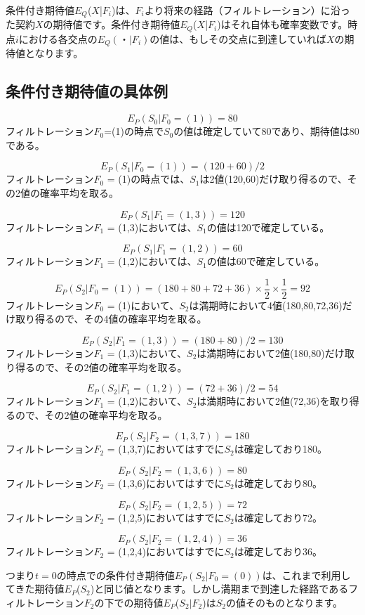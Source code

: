 \documentclass[uplatex,a4j,12pt,dvipdfmx]{jsarticle}
\begin{document}
条件付き期待値$E_Q$($X$|$F_i$)は、$F_i$より将来の経路（フィルトレーション）に沿った契約$X$の期待値です。条件付き期待値$E_Q$($X$|$F_i$)はそれ自体も確率変数です。時点$i$における各交点の$E_Q(・|F_i)$の値は、もしその交点に到達していれば$X$の期待値となります。

\subsection{条件付き期待値の具体例}

\[E_P( S_0 | F_0=(1) ) = 80\]
フィルトレーション$F_0$=(1)の時点で$S_0$の値は確定していて80であり、期待値は80である。

\[E_P( S_1 | F_0=(1) ) = (120+60)/2\]
フィルトレーション$F_0$ = (1)の時点では、$S_1$は2値(120,60)だけ取り得るので、その2値の確率平均を取る。

\[E_P( S_1 | F_1=(1,3) ) = 120\]
フィルトレーション$F_1$ = (1,3)においては、$S_1$の値は120で確定している。

\[E_P( S_1 | F_1=(1,2) ) = 60\]
フィルトレーション$F_1$ = (1,2)においては、$S_1$の値は60で確定している。

\[E_P( S_2 | F_0=(1) ) = (180+80+72+36) \times \frac{1}{2} \times \frac{1}{2} = 92\]
フィルトレーション$F_0$ = (1)において、$S_2$は満期時において4値(180,80,72,36)だけ取り得るので、その4値の確率平均を取る。

\[E_P( S_2 | F_1=(1,3) ) = (180+80)/2 = 130\]
フィルトレーション$F_1$ = (1,3)において、$S_2$は満期時において2値(180,80)だけ取り得るので、その2値の確率平均を取る。

\[E_P( S_2 | F_1=(1,2) ) = (72+36)/2 = 54\]
フィルトレーション$F_1$ = (1,2)において、$S_2$は満期時において2値(72,36)を取り得るので、その2値の確率平均を取る。

\[E_P( S_2 | F_2=(1,3,7) ) = 180\]
フィルトレーション$F_2$ = (1,3,7)においてはすでに$S_2$は確定しており180。

\[E_P( S_2 | F_2=(1,3,6) ) = 80\]
フィルトレーション$F_2$ = (1,3,6)においてはすでに$S_2$は確定しており80。

\[E_P( S_2 | F_2=(1,2,5) ) = 72\]
フィルトレーション$F_2$ = (1,2,5)においてはすでに$S_2$は確定しており72。

\[E_P( S_2 | F_2=(1,2,4) ) = 36\]
フィルトレーション$F_2$ = (1,2,4)においてはすでに$S_2$は確定しており36。

つまり$t=0$の時点での条件付き期待値$E_{P}(S_{2}|F_{0}=(0))$は、これまで利用してきた期待値$E_P$($S_2$)と同じ値となります。しかし満期まで到達した経路であるフィルトレーション$F_2$の下での期待値$E_P$($S_2|F_2$)は$S_2$の値そのものとなります。
\end{document}
